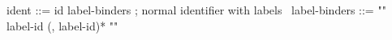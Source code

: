 \begin{syntax}
  ident ::= id label-binders ; normal identifier with labels
  \
  label-binders ::= "{" label-id (, label-id)* "}"
\end{syntax}
